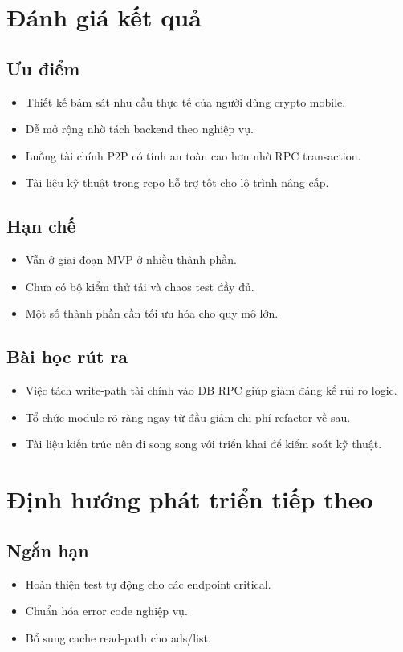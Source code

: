 \documentclass[a4paper,12pt]{report}
\begin{document}
\chapter{Đánh giá kết quả}

\section{Ưu điểm}
\begin{itemize}
    \item Thiết kế bám sát nhu cầu thực tế của người dùng crypto mobile.
    \item Dễ mở rộng nhờ tách backend theo nghiệp vụ.
    \item Luồng tài chính P2P có tính an toàn cao hơn nhờ RPC transaction.
    \item Tài liệu kỹ thuật trong repo hỗ trợ tốt cho lộ trình nâng cấp.
\end{itemize}

\section{Hạn chế}
\begin{itemize}
    \item Vẫn ở giai đoạn MVP ở nhiều thành phần.
    \item Chưa có bộ kiểm thử tải và chaos test đầy đủ.
    \item Một số thành phần cần tối ưu hóa cho quy mô lớn.
\end{itemize}

\section{Bài học rút ra}
\begin{itemize}
    \item Việc tách write-path tài chính vào DB RPC giúp giảm đáng kể rủi ro logic.
    \item Tổ chức module rõ ràng ngay từ đầu giảm chi phí refactor về sau.
    \item Tài liệu kiến trúc nên đi song song với triển khai để kiểm soát kỹ thuật.
\end{itemize}

\chapter{Định hướng phát triển tiếp theo}

\section{Ngắn hạn}
\begin{itemize}
    \item Hoàn thiện test tự động cho các endpoint critical.
    \item Chuẩn hóa error code nghiệp vụ.
    \item Bổ sung cache read-path cho ads/list.
\end{itemize}
\end{document}
